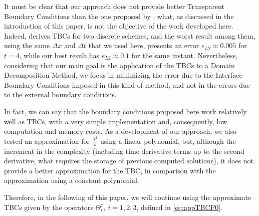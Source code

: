 \indent It must be clear that our approach does not provide better Transparent Boundary Conditions than the one proposed by \cite{besse2015}, what, as discussed in the introduction of this paper, is not the objective of the work developed here. Indeed, \cite{besse2015} derives TBCs for two discrete schemes, and the worst result among them, using the same $\Delta x $ and $\Delta t$ that we used here, presents an error $e_{L2} \approx 0.005$ for $t = 4$, while our best result has $e_{L2} \approx 0.1$ for the same instant. Nevertheless, considering that our main goal is the application of the TBCs to a Domain Decomposition Method, we focus in minimizing the error due to the Interface Boundary Conditions imposed in this kind of method, and not in the errors due to the external boundary conditions.

\indent In fact, we can say that the boundary conditions proposed here work relatively well as TBCs, with a very simple implementation and, consequently, low computation and memory costs. As a development of our approach, we also tested an approximation for $\frac{\lambda^2}{s}$ using a linear polynomial, but, although the increment in the complexity (including time derivative terms up to the second derivative, what requires the storage of previous computed solutions), it does not provide a better approximation for the TBC, in comparison with the approximation using a constant polynomial.

\indent Therefore, in the following of this paper, we will continue using the approximate TBCs given by the operators $\Theta_i^{c}, \ i=1,2,3$, defined in \eqref{eq:appTBCP0}.











